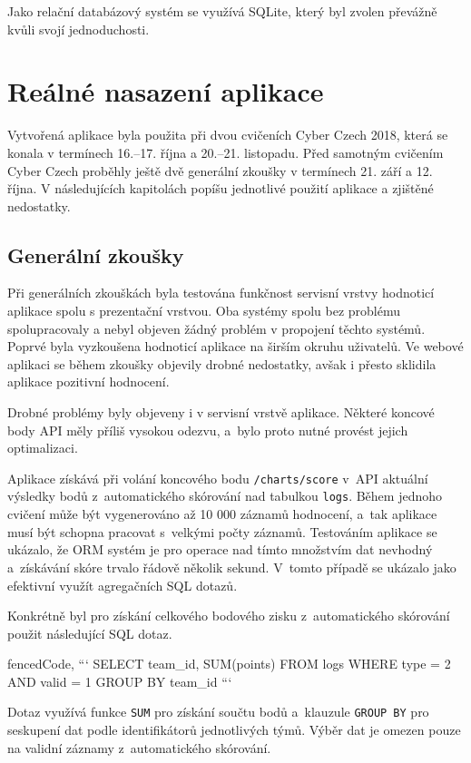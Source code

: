 \documentclass[
  digital,
  twoside,
  table, 
  nolof, 
  nolot
]{fithesis3}
\begin{document}
Jako relační databázový systém se využívá SQLite, který byl zvolen převážně kvůli svojí jednoduchosti.

\section{Reálné nasazení aplikace}

Vytvořená aplikace byla použita při dvou cvičeních Cyber Czech 2018, která se konala v termínech 16.--17. října a 20.--21. listopadu. Před samotným cvičením Cyber Czech proběhly ještě dvě generální zkoušky v termínech 21. září a 12. října. V následujících kapitolách popíšu jednotlivé použití aplikace a zjištěné nedostatky.

\subsection{Generální zkoušky}
Při generálních zkouškách byla testována funkčnost servisní vrstvy hodnoticí aplikace spolu s prezentační vrstvou. Oba systémy spolu bez problému spolupracovaly a nebyl objeven žádný problém v propojení těchto systémů. Poprvé byla vyzkoušena hodnoticí aplikace na širším okruhu uživatelů. Ve webové aplikaci se během zkoušky objevily drobné nedostatky, avšak i přesto sklidila aplikace pozitivní hodnocení.

Drobné problémy byly objeveny i v servisní vrstvě aplikace. Některé koncové body API měly příliš vysokou odezvu, a~bylo proto nutné provést jejich optimalizaci.

Aplikace získává při volání koncového bodu \texttt{/charts/score} v~API aktuální výsledky bodů z~automatického skórování nad tabulkou \texttt{logs}. Během jednoho cvičení může být vygenerováno až 10 000 záznamů hodnocení, a~tak aplikace musí být schopna pracovat s~velkými počty záznamů. Testováním aplikace se ukázalo, že ORM systém je pro operace nad tímto množstvím dat nevhodný a~získávání skóre trvalo řádově několik sekund. V~tomto případě se ukázalo jako efektivní využít agregačních SQL dotazů. 

Konkrétně byl pro získání celkového bodového zisku z~automatického skórování použit následující SQL dotaz.

\begin{markdown*}{%
  fencedCode,
}
```
SELECT team_id, SUM(points) FROM logs 
WHERE type = 2 AND valid = 1 
GROUP BY team_id
```
\end{markdown*}

Dotaz využívá funkce \texttt{SUM} pro získání součtu bodů a~klauzule \texttt{GROUP\ BY} pro seskupení dat podle identifikátorů jednotlivých týmů. Výběr dat je omezen pouze na validní záznamy z~automatického skórování.
\end{document}

